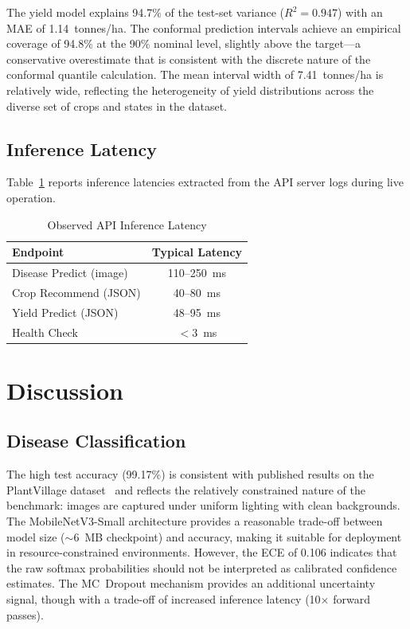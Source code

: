 \documentclass[conference]{IEEEtran}
\begin{document}
The yield model explains 94.7\% of the test-set variance ($R^{2} = 0.947$) with an MAE of 1.14~tonnes/ha. The conformal prediction intervals achieve an empirical coverage of 94.8\% at the 90\% nominal level, slightly above the target---a conservative overestimate that is consistent with the discrete nature of the conformal quantile calculation. The mean interval width of 7.41~tonnes/ha is relatively wide, reflecting the heterogeneity of yield distributions across the diverse set of crops and states in the dataset.

\subsection{Inference Latency}

Table~\ref{tab:latency} reports inference latencies extracted from the API server logs during live operation.

\begin{table}[htbp]
  \centering
  \caption{Observed API Inference Latency}
  \label{tab:latency}
  \begin{tabular}{lc}
    \toprule
    \textbf{Endpoint} & \textbf{Typical Latency} \\
    \midrule
    Disease Predict (image)   & 110--250~ms \\
    Crop Recommend (JSON)     & 40--80~ms \\
    Yield Predict (JSON)      & 48--95~ms \\
    Health Check              & $<$3~ms \\
    \bottomrule
  \end{tabular}
\end{table}


\section{Discussion}
\label{sec:discussion}

\subsection{Disease Classification}
The high test accuracy (99.17\%) is consistent with published results on the PlantVillage dataset~\cite{mohanty2016using} and reflects the relatively constrained nature of the benchmark: images are captured under uniform lighting with clean backgrounds. The MobileNetV3-Small architecture provides a reasonable trade-off between model size (${\sim}$6~MB checkpoint) and accuracy, making it suitable for deployment in resource-constrained environments. However, the ECE of 0.106 indicates that the raw softmax probabilities should not be interpreted as calibrated confidence estimates. The MC~Dropout mechanism provides an additional uncertainty signal, though with a trade-off of increased inference latency (10$\times$ forward passes).
\end{document}
